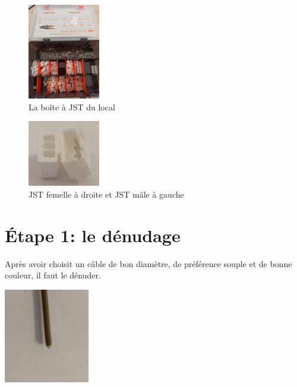 \documentclass{article}
\begin{document}
\begin{figure}
    \begin{center}
        \includegraphics[width=0.28\textwidth]{images/boite_JST.jpg}
    \end{center}
    \captionsetup{labelformat=empty}
    \caption{La boîte à JST du local}
\end{figure}

\begin{figure}
    \begin{center}
        \includegraphics[width=0.28\textwidth]{images/JST_male_et_femelle.jpg}
    \end{center}
    \captionsetup{labelformat=empty}
    \caption{JST femelle à droite et JST mâle à gauche}
\end{figure}

\newpage
\section*{Étape 1: le dénudage}

\hspace{0.5cm} Après avoir choisit un câble de bon diamètre, de préférence souple et de bonne couleur, il faut le dénuder. 

\begin{minipage}{\textwidth}
    \vspace{0.5cm}
    \begin{center}
    \includegraphics[width=0.28\textwidth]{images/fil_non_denude.jpg}
    \captionsetup{labelformat=empty}
    \end{center}
    \vspace{0.5cm}
\end{minipage}
\end{document}
